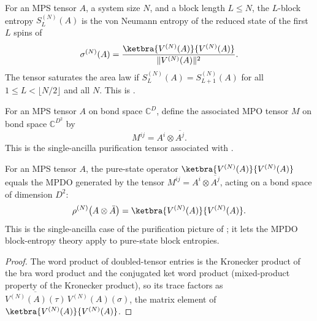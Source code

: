 \begin{definition}
    \label{def:pure_sal}
    \leanok
    For an MPS tensor $A$, a system size $N$, and a block length $L\le N$,
    the $L$-block entropy $S_L^{(N)}(A)$ is the von Neumann entropy of the
    reduced state of the first $L$ spins of
    \[
        \sigma^{(N)}(A)
        =
        \frac{\ketbra{V^{(N)}(A)}{V^{(N)}(A)}}{\|V^{(N)}(A)\|^2}.
    \]
    The tensor saturates the area law if
    $S_L^{(N)}(A) = S_{L+1}^{(N)}(A)$ for all
    $1 \le L < \lfloor N/2 \rfloor$ and all $N$.
    This is \cite[Definition~3.13, line~600]{Cirac2016MPDO_arXiv}.
\end{definition}

\begin{definition}\label{def:doubled_tensor}
    \leanok
    For an MPS tensor $A$ on bond space $\mathbb{C}^D$, define the associated
    MPO tensor $M$ on bond space $\mathbb{C}^{D^2}$ by
    \[
        M^{ij} = A^i \otimes \overline{A^j}.
    \]
    This is the single-ancilla purification tensor associated with
    \cite[eq.~(line~752)]{Cirac2016MPDO_arXiv}.
\end{definition}

\begin{lemma}\label{lem:mpo_doubled}
    \leanok
    For an MPS tensor $A$, the pure-state operator
    $\ketbra{V^{(N)}(A)}{V^{(N)}(A)}$ equals the MPDO generated by the tensor
    $M^{ij} = A^i \otimes \overline{A^j}$, acting on a bond space of
    dimension $D^2$:
    \[
        \rho^{(N)}\bigl(A \otimes \bar A\bigr) = \ketbra{V^{(N)}(A)}{V^{(N)}(A)}.
    \]
    This is the single-ancilla case of the purification picture of
    \cite[eq.~(line~752)]{Cirac2016MPDO_arXiv}; it lets the MPDO block-entropy
    theory apply to pure-state block entropies.
\end{lemma}
\begin{proof}\leanok
    The word product of doubled-tensor entries is the Kronecker product of the
    bra word product and the conjugated ket word product (mixed-product property
    of the Kronecker product), so its trace factors as
    $\overline{V^{(N)}(A)(\tau)}\,V^{(N)}(A)(\sigma)$, the matrix element of
    $\ketbra{V^{(N)}(A)}{V^{(N)}(A)}$.
\end{proof}


